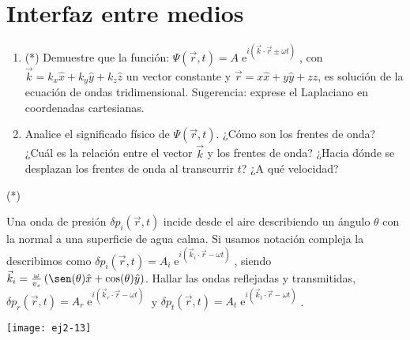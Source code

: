 \section*{Interfaz entre medios}

\item 
\begin{enumerate}
	\item (*) Demuestre que la función: $\Psi (\vec{r}, t) = A \operatorname{e}^{ i (\vec{k} \cdot \vec{r} \pm \omega t) }$, con $\vec{k} = k_x \hat{x} + k_y \hat{y} + k_z \hat{z}$ un vector constante y $\vec{r}= x \hat{x} + y \hat{y} + z \hat{z}$, es solución de la ecuación de ondas tridimensional.
	Sugerencia: exprese el Laplaciano en coordenadas cartesianas.
	\item Analice el significado físico de $\Psi (\vec{r}, t)$.
	¿Cómo son los frentes de onda?
	¿Cuál es la relación entre el vector $\vec{k}$ y los frentes de onda?
	¿Hacia dónde se desplazan los frentes de onda al transcurrir $t$?
	¿A qué velocidad?
\end{enumerate}


\item (*)
\begin{minipage}[t][2cm]{0.75\textwidth}
Una onda de presión \( \delta p_i (\vec{r},t)\) incide desde el aire describiendo un ángulo $\theta$ con la normal a una superficie de agua calma.
Si usamos notación compleja la describimos como $\delta p_{i} (\vec{r}, t) = A_i \operatorname{e}^{i (\vec{k}_{i} \cdot \vec{r} - \omega t) }$, siendo $\vec{k}_i = \frac{ \omega }{ v_s } \left( \sen(\theta) \hat{x} + \cos(\theta) \hat{y} \right)$.
Hallar las ondas reflejadas y transmitidas, $\delta p_r (\vec{r}, t) = A_r \operatorname{e}^{ i ( \vec{k}_r \cdot \vec{r} - \omega t) }$ y $\delta p_t (\vec{r}, t) = A_t \operatorname{e}^{ i (\vec{k}_t \cdot \vec{r} - \omega t) }$.
\end{minipage}
\begin{minipage}[c][0.4cm][t]{0.2\textwidth}
	\texttt{[image: ej2-13]}
\end{minipage}
